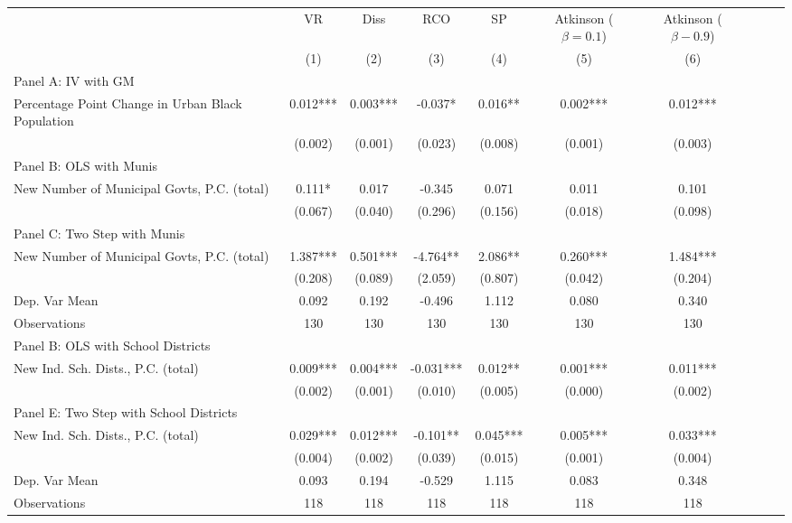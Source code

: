  \begin{tabular}{l*{9}{c}} \toprule
&\multicolumn{1}{c}{VR}&\multicolumn{1}{c}{Diss}&\multicolumn{1}{c}{RCO}&\multicolumn{1}{c}{SP}&\multicolumn{1}{c}{Atkinson ($\beta = 0.1$)}&\multicolumn{1}{c}{Atkinson ($\beta - 0.9$)}\\\cmidrule(lr){2-2}\cmidrule(lr){3-3}\cmidrule(lr){4-4}\cmidrule(lr){5-5}\cmidrule(lr){6-6}\cmidrule(lr){7-7}
&\multicolumn{1}{c}{(1)}&\multicolumn{1}{c}{(2)}&\multicolumn{1}{c}{(3)}&\multicolumn{1}{c}{(4)}&\multicolumn{1}{c}{(5)}&\multicolumn{1}{c}{(6)}\\
\cmidrule(lr){1-7}
\multicolumn{6}{l}{Panel A: IV with GM}\\
\cmidrule(lr){1-7}
Percentage Point Change in Urban Black Population&    0.012***&    0.003***&   -0.037*  &    0.016** &    0.002***&    0.012***\\
                &  (0.002)   &  (0.001)   &  (0.023)   &  (0.008)   &  (0.001)   &  (0.003)   \\
\cmidrule(lr){1-7}
\multicolumn{6}{l}{Panel B: OLS with Munis}\\
\cmidrule(lr){1-7}
New Number of Municipal Govts, P.C. (total)&    0.111*  &    0.017   &   -0.345   &    0.071   &    0.011   &    0.101   \\
                &  (0.067)   &  (0.040)   &  (0.296)   &  (0.156)   &  (0.018)   &  (0.098)   \\
\cmidrule(lr){1-7}
\multicolumn{6}{l}{Panel C: Two Step with Munis}\\
\cmidrule(lr){1-7}
New Number of Municipal Govts, P.C. (total)&    1.387***&    0.501***&   -4.764** &    2.086** &    0.260***&    1.484***\\
                &  (0.208)   &  (0.089)   &  (2.059)   &  (0.807)   &  (0.042)   &  (0.204)   \\
\midrule
Dep. Var Mean   &    0.092   &    0.192   &   -0.496   &    1.112   &    0.080   &    0.340   \\
Observations    &      130   &      130   &      130   &      130   &      130   &      130   \\
\cmidrule(lr){1-7}
\multicolumn{6}{l}{Panel B: OLS with School Districts}\\
\cmidrule(lr){1-7}
New Ind. Sch. Dists., P.C. (total)&    0.009***&    0.004***&   -0.031***&    0.012** &    0.001***&    0.011***\\
                &  (0.002)   &  (0.001)   &  (0.010)   &  (0.005)   &  (0.000)   &  (0.002)   \\
\cmidrule(lr){1-7}
\multicolumn{6}{l}{Panel E: Two Step with School Districts}\\
\cmidrule(lr){1-7}
New Ind. Sch. Dists., P.C. (total)&    0.029***&    0.012***&   -0.101** &    0.045***&    0.005***&    0.033***\\
                &  (0.004)   &  (0.002)   &  (0.039)   &  (0.015)   &  (0.001)   &  (0.004)   \\
\midrule
Dep. Var Mean   &    0.093   &    0.194   &   -0.529   &    1.115   &    0.083   &    0.348   \\
Observations    &      118   &      118   &      118   &      118   &      118   &      118   \\
       \bottomrule \end{tabular}
